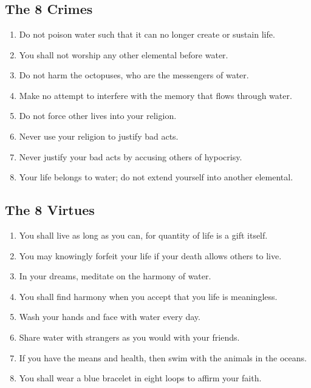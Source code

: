 \documentclass[12pt, letterpaper]{report}
\begin{document}
\chapter{}

\section{The 8 Crimes}

\begin{enumerate}
  \item Do not poison water such that it can no longer create or sustain life.
  \item You shall not worship any other elemental before water.
  \item Do not harm the octopuses, who are the messengers of water.
  \item Make no attempt to interfere with the memory that flows through water.
  \item Do not force other lives into your religion.
  \item Never use your religion to justify bad acts.
  \item Never justify your bad acts by accusing others of hypocrisy.
  \item Your life belongs to water; do not extend yourself into another elemental.
\end{enumerate}

\section{The 8 Virtues}

\begin{enumerate}
  \item You shall live as long as you can, for quantity of life is a gift itself.
  \item You may knowingly forfeit your life if your death allows others to live.
  \item In your dreams, meditate on the harmony of water.
  \item You shall find harmony when you accept that you life is meaningless.
  \item Wash your hands and face with water every day.
  \item Share water with strangers as you would with your friends.
  \item If you have the means and health, then swim with the animals in the oceans.
  \item You shall wear a blue bracelet in eight loops to affirm your faith.
\end{enumerate}
\end{document}
